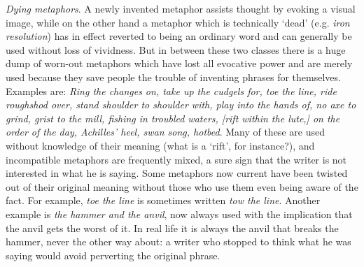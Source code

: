 \textit{Dying metaphors}. A newly invented metaphor assists thought by
evoking a visual image, while on the other hand a metaphor which is
technically `dead' (e.g. \textit{iron resolution}) has in effect
reverted to being an ordinary word and can generally be used without
loss of vividness. But in between these two classes there is a huge
dump of worn-out metaphors which have lost all evocative power and are
merely used because they save people the trouble of inventing phrases
for themselves. Examples are: \textit{Ring the changes on, take up the
cudgels for, toe the line, ride roughshod over, stand shoulder to
shoulder with, play into the hands of, no axe to grind, grist to the
mill, fishing in troubled waters, [rift within the lute,] on the order
of the day, Achilles' heel, swan song, hotbed}. Many of these are used
without knowledge of their meaning (what is a `rift', for instance?),
and incompatible metaphors are frequently mixed, a sure sign that the
writer is not interested in what he is saying. Some metaphors now
current have been twisted out of their original meaning without those
who use them even being aware of the fact. For example, \textit{toe
the line} is sometimes written \textit{tow the line}. Another example
is \textit{the hammer and the anvil}, now always used with the
implication that the anvil gets the worst of it. In real life it is
always the anvil that breaks the hammer, never the other way about: a
writer who stopped to think what he was saying would avoid perverting
the original phrase.

\vspace{1\baselineskip}

